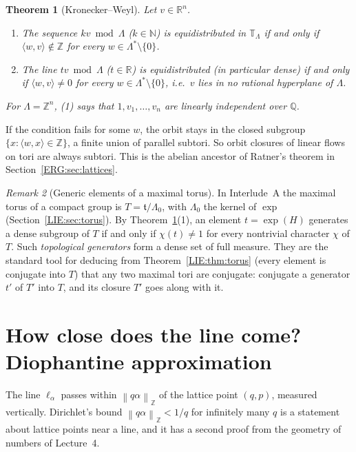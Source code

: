 \documentclass[11pt,openany]{book}
\theoremstyle{plain}
\newtheorem{theorem}{Theorem}[chapter]
\theoremstyle{definition}
\theoremstyle{remark}
\newtheorem{remark}[theorem]{Remark}
\newcommand{\R}{\mathbb{R}}
\newcommand{\Z}{\mathbb{Z}}
\newcommand{\Q}{\mathbb{Q}}
\newcommand{\N}{\mathbb{N}}
\newcommand{\T}{\mathbb{T}}
\newcommand{\Lat}{\Lambda}             %
\newcommand{\norm}[1]{\left\lVert #1 \right\rVert}
\newcommand{\ip}[2]{\langle #1, #2\rangle}
\begin{document}
\begin{theorem}[Kronecker--Weyl]\label{ERG:thm:kroneckerweyl}
Let $v\in\R^n$.
\begin{enumerate}[nosep]
\item The sequence $kv\bmod\Lat$ ($k\in\N$) is equidistributed in $\T_\Lat$ if and only if
  $\ip{w}{v}\notin\Z$ for every $w\in\Lat^*\setminus\{0\}$.
\item The line $tv\bmod\Lat$ ($t\in\R$) is equidistributed (in particular dense) if and only if
  $\ip{w}{v}\neq0$ for every $w\in\Lat^*\setminus\{0\}$, i.e.\ $v$ lies in no rational hyperplane of
  $\Lat$.
\end{enumerate}
For $\Lat=\Z^n$, (1) says that $1,v_1,\dots,v_n$ are linearly independent over $\Q$.
\end{theorem}

If the condition fails for some $w$, the orbit stays in the closed subgroup $\{x:\ip{w}{x}\in\Z\}$,
a finite union of parallel subtori. So orbit closures
of linear flows on tori are always subtori. This is the abelian ancestor of Ratner's theorem in
Section~\ref{ERG:sec:lattices}.

\begin{remark}[Generic elements of a maximal torus]
In Interlude~A the maximal torus of a compact group is $T=\mathfrak t/\Lat_0$, with $\Lat_0$ the kernel
of $\exp$ (Section~\ref{LIE:sec:torus}). By Theorem~\ref{ERG:thm:kroneckerweyl}(1), an element
$t=\exp(H)$ generates a dense subgroup of $T$ if and only if $\chi(t)\neq1$ for every nontrivial
character $\chi$ of $T$. Such \emph{topological generators} form a dense set of full measure. They are
the standard tool for deducing from Theorem~\ref{LIE:thm:torus} (every element is conjugate into $T$)
that any two maximal tori are conjugate: conjugate a generator $t'$ of $T'$ into $T$, and its closure
$T'$ goes along with it.
\end{remark}

\section{How close does the line come? Diophantine approximation}
\label{ERG:sec:dioph}

The line $\ell_\alpha$ passes within $\norm{q\alpha}_\Z$ of the lattice point $(q,p)$, measured
vertically. Dirichlet's bound $\norm{q\alpha}_\Z<1/q$ for infinitely many $q$ is a statement about
lattice points near a line, and it has a second proof from the geometry of numbers of Lecture~4.
\end{document}
